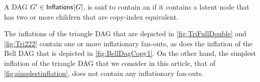 


\begin{definition}
A DAG $G'\in{\operatorname{\mathsf{Inflations}}_{}}\lbrack G\rbrack$, is said to contain an  if it contains a latent node that has two or more children that are copy-index equivalent.  
\end{definition}

The inflations of the triangle DAG that are depicted in \cref{fig:TriFullDouble} and \cref{fig:Tri222} contain one or more inflationary fan-outs, as does the inflation of the Bell DAG that is depicted in \cref{fig:BellDagCopy1}.  On the other hand, the simplest inflation of the triangle DAG that we consider in this article, that of \cref{fig:simplestinflation}, does not contain any inflationary fan-outs.


